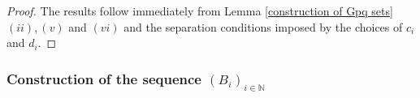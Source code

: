 \documentclass[12pt]{article}
\begin{document}
 \begin{proof}
 The results follow immediately from Lemma \ref{construction of Gpq sets} $(ii), (v)$ and $(vi)$ and the separation conditions imposed by the choices of $c_i$ and $d_i$. \qedhere



\end{proof}

\subsubsection{Construction of the sequence \texorpdfstring{$(B_i)_{i \in \mathbb{N}}$}{Bn}}
\end{document}

